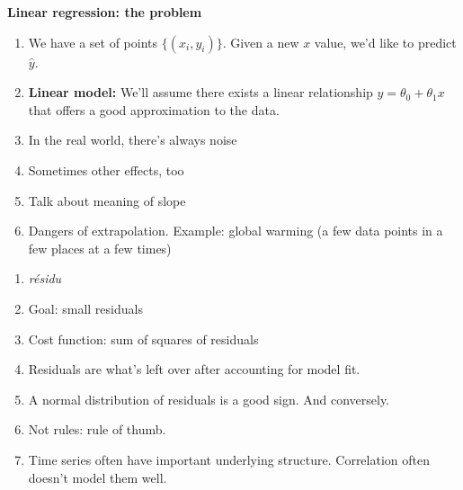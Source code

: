 




\textbf{Linear regression: the problem}
\begin{enumerate}
\item {} We have a set of points $\{(x_i, y_i)\}$.
  Given a new $x$ value, we'd like to predict $\hat y$.
\item \textbf{Linear model:} We'll assume there exists a linear
  relationship $y=\theta_0 + \theta_1 x$ that offers a good
  approximation to the data.
\item In the real world, there's always noise
\item Sometimes other effects, too
\item Talk about meaning of slope
\item Dangers of extrapolation.  Example: global warming (a few data
  points in a few places at a few times)
\end{enumerate}

\begin{enumerate}
\item \textit{résidu}
\item Goal: small residuals
\item Cost function: sum of squares of residuals
\item Residuals are what's left over after accounting for model fit.
\item A normal distribution of residuals is a good sign.  And
  conversely.
\item Not rules: rule of thumb.
\item Time series often have important underlying structure.
  Correlation often doesn't model them well.
\end{enumerate}

